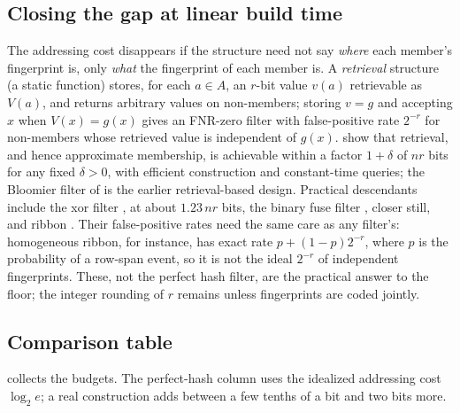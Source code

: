 \subsection*{Closing the gap at linear build time}

The addressing cost disappears if the structure need not say
\emph{where} each member's fingerprint is, only \emph{what} the
fingerprint of each member is. A
\emph{retrieval} structure (a static function) stores,
for each $a \in A$, an $r$-bit value $v(a)$ retrievable as $V(a)$, and
returns arbitrary values on non-members; storing $v = g$ and accepting $x$
when $V(x) = g(x)$ gives an FNR-zero filter with false-positive rate
$2^{-r}$ for non-members whose retrieved value is independent of $g(x)$.
\textcite{dietzfelbinger-pagh-2008} show that retrieval, and hence
approximate membership, is achievable within a factor $1 + \delta$ of
$n r$ bits for any fixed $\delta > 0$, with efficient construction and
constant-time queries; the Bloomier filter of
\textcite{chazelle-et-al-2004} is the earlier retrieval-based design.
Practical descendants include the xor filter
\parencite{graf-lemire-2020}, at about $1.23\, n r$ bits, the binary fuse
filter \parencite{graf-lemire-2022}, closer still, and ribbon
\parencite{dietzfelbinger-et-al-2026-ribbon}. Their false-positive rates
need the same care as any filter's: homogeneous ribbon, for instance, has
exact rate $p + (1 - p) 2^{-r}$, where $p$ is the probability of a
row-span event, so it is not the ideal $2^{-r}$ of independent
fingerprints. These, not the perfect
hash filter, are the practical answer to the floor; the integer rounding
of $r$ remains unless fingerprints are coded jointly.

\subsection*{Comparison table}

 collects the budgets. The perfect-hash column
uses the idealized addressing cost $\log_2 e$; a real construction adds
between a few tenths of a bit and two bits more.

